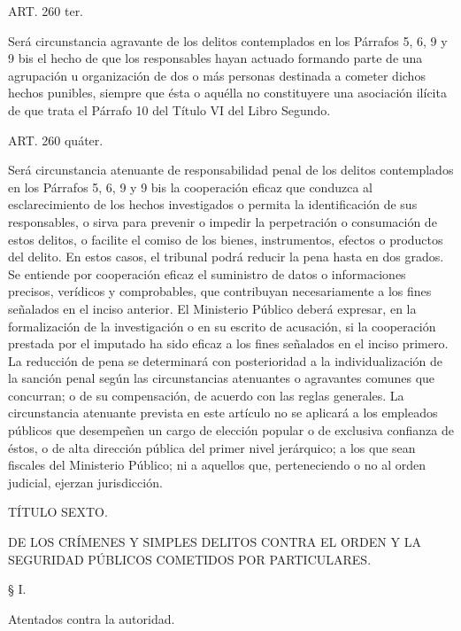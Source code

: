    ART. 260 ter.

    Será circunstancia agravante de los delitos contemplados en los Párrafos 5, 6, 9 y 9 bis el hecho de que los responsables hayan actuado formando parte de una agrupación u organización de dos o más personas destinada a cometer dichos hechos punibles, siempre que ésta o aquélla no constituyere una asociación ilícita de que trata el Párrafo 10 del Título VI del Libro Segundo.




    ART. 260 quáter.

    Será circunstancia atenuante de responsabilidad penal de los delitos contemplados en los Párrafos 5, 6, 9 y 9 bis la cooperación eficaz que conduzca al esclarecimiento de los hechos investigados o permita la identificación de sus responsables, o sirva para prevenir o impedir la perpetración o consumación de estos delitos, o facilite el comiso de los bienes, instrumentos, efectos o productos del delito. En estos casos, el tribunal podrá reducir la pena hasta en dos grados.
    Se entiende por cooperación eficaz el suministro de datos o informaciones precisos, verídicos y comprobables, que contribuyan necesariamente a los fines señalados en el inciso anterior.
    El Ministerio Público deberá expresar, en la formalización de la investigación o en su escrito de acusación, si la cooperación prestada por el imputado ha sido eficaz a los fines señalados en el inciso primero.
    La reducción de pena se determinará con posterioridad a la individualización de la sanción penal según las circunstancias atenuantes o agravantes comunes que concurran; o de su compensación, de acuerdo con las reglas generales.
    La circunstancia atenuante prevista en este artículo no se aplicará a los empleados públicos que desempeñen un cargo de elección popular o de exclusiva confianza de éstos, o de alta dirección pública del primer nivel jerárquico; a los que sean fiscales del Ministerio Público; ni a aquellos que, perteneciendo o no al orden judicial, ejerzan jurisdicción.




    TÍTULO SEXTO.

DE LOS CRÍMENES Y SIMPLES DELITOS CONTRA EL ORDEN Y LA SEGURIDAD PÚBLICOS COMETIDOS POR PARTICULARES.




    § I.

    Atentados contra la autoridad.








